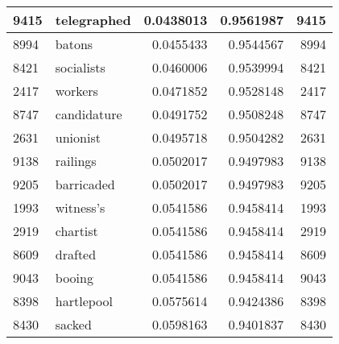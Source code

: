 \documentclass{article}\usepackage[]{graphicx}\usepackage[]{color}
\newenvironment{knitrout}{}{} %
\begin{document}
\begin{knitrout}
\begin{tabular}{l|l|r|r|r}
\hline
9415 & telegraphed & 0.0438013 & 0.9561987 & 9415\\
\hline
8994 & batons & 0.0455433 & 0.9544567 & 8994\\
\hline
8421 & socialists & 0.0460006 & 0.9539994 & 8421\\
\hline
2417 & workers & 0.0471852 & 0.9528148 & 2417\\
\hline
8747 & candidature & 0.0491752 & 0.9508248 & 8747\\
\hline
2631 & unionist & 0.0495718 & 0.9504282 & 2631\\
\hline
9138 & railings & 0.0502017 & 0.9497983 & 9138\\
\hline
9205 & barricaded & 0.0502017 & 0.9497983 & 9205\\
\hline
1993 & witness's & 0.0541586 & 0.9458414 & 1993\\
\hline
2919 & chartist & 0.0541586 & 0.9458414 & 2919\\
\hline
8609 & drafted & 0.0541586 & 0.9458414 & 8609\\
\hline
9043 & booing & 0.0541586 & 0.9458414 & 9043\\
\hline
8398 & hartlepool & 0.0575614 & 0.9424386 & 8398\\
\hline
8430 & sacked & 0.0598163 & 0.9401837 & 8430\\
\hline
\end{tabular}


\end{knitrout}
\end{document}
